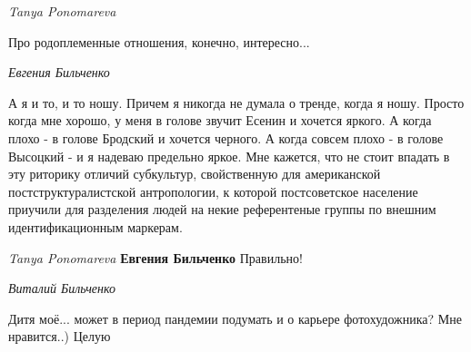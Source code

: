 \emph{Tanya Ponomareva}

Про родоплеменные отношения, конечно, интересно...

\emph{Евгения Бильченко}

А я и то, и то ношу. Причем я никогда не думала о тренде, когда я ношу. Просто
когда мне хорошо, у меня в голове звучит Есенин и хочется яркого. А когда плохо
- в голове Бродский и хочется черного. А когда совсем плохо - в голове Высоцкий
- и я надеваю предельно яркое. Мне кажется, что не стоит впадать в эту риторику
отличий субкультур, свойственную для американской постструктуралистской
антропологии, к которой постсоветское население приучили для разделения людей
на некие референтеные группы по внешним идентификационным маркерам.

\emph{Tanya Ponomareva}
\textbf{Евгения Бильченко} Правильно!

\emph{Виталий Бильченко}

Дитя моё... может в период пандемии подумать и о карьере фотохудожника?
Мне нравится..)
Целую
